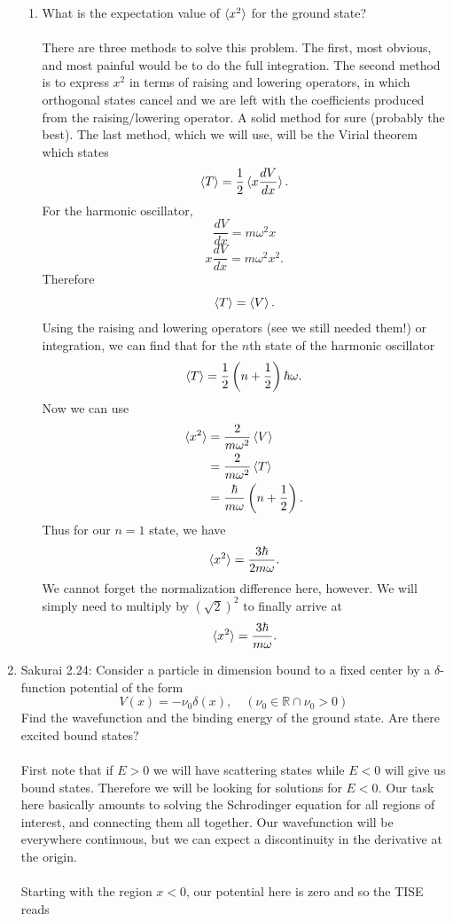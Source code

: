 \documentclass[11pt,letterpaper]{article}
\begin{document}
\begin{enumerate}
\begin{enumerate}
\item What is the expectation value of $\braket{x^2}$ for the ground state?
\\ \\There are three methods to solve this problem. The first, most obvious, and most painful would be to do the full integration. The second method is to express $x^2$ in terms of raising and lowering operators, in which orthogonal states cancel and we are left with the coefficients produced from the raising/lowering operator. A solid method for sure (probably the best). The last method, which we will use, will be the Virial theorem which states
$$\braket{T} = \frac{1}{2}\braket{x\frac{dV}{dx}}.$$
For the harmonic oscillator,
$$\frac{dV}{dx} = m\omega^2x$$
$$x\frac{dV}{dx} = m\omega^2x^2.$$
Therefore
$$\braket{T} = \braket{V}.$$
Using the raising and lowering operators (see we still needed them!) or integration, we can find that for the $n$th state of the harmonic oscillator 
$$\braket{T} = \frac{1}{2}\left(n+\frac{1}{2}\right)\hbar\omega.$$
Now we can use
\begin{align*}\braket{x^2} &= \frac{2}{m\omega^2}\braket{V}\\
&=\frac{2}{m\omega^2}\braket{T}\\
&=\frac{\hbar}{m\omega}\left(n+\frac{1}{2}\right).
\end{align*}
Thus for our $n=1$ state, we have
$$\braket{x^2} = \frac{3\hbar}{2m\omega}.$$
We cannot forget the normalization difference here, however. We will simply need to multiply by $(\sqrt2)^2$ to finally arrive at
$$\braket{x^2} = \frac{3\hbar}{m\omega}.$$
\end{enumerate}
\item Sakurai 2.24: Consider a particle in dimension bound to a fixed center by a $\delta$-function potential of the form
$$V(x) = -\nu_0\delta(x),\quad(\nu_0\in\mathbb{R}\cap\nu_0>0)$$
Find the wavefunction and the binding energy of the ground state. Are there excited bound states?
\\ \\First note that if $E>0$ we will have scattering states while $E<0$ will give us bound states. Therefore we will be looking for solutions for $E<0$. Our task here basically amounts to solving the Schrodinger equation for all regions of interest, and connecting them all together. Our wavefunction will be everywhere continuous, but we can expect a discontinuity in the derivative at the origin. 
\\ \\Starting with the region $x<0$, our potential here is zero and so the TISE reads

\end{enumerate}
\end{document}
